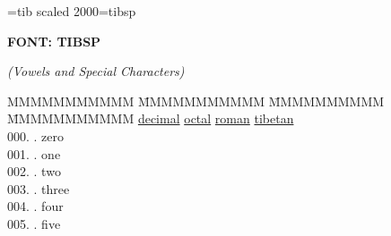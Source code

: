 \font\tibetan=tib scaled 2000\font\tibsp=tibsp 

\begin{flushleft}
{\large\bf FONT: TIBSP}

{\it (Vowels and Special Characters)}
\end{flushleft}
\vspace{.1in}

\begin{tabbing}
MMMMMMMMMMM \=MMMMMMMMMMM \=MMMMMMMMMM \= MMMMMMMMMMM \kill
\underline{decimal}\> \underline{octal}\> \underline{roman}\> \underline{tibetan} \\
000. .	\> zero	\> \bgroup\tibetan \def\u#1{\vtop{\baselineskip0pt\hbox{#1}\hbox{\tibsp\char123}}}\parindent=0pt \newbox\fillerbox\setbox\fillerbox\hbox{\vrule height0.4cm depth0.4cm width0pt}\def\filler{\copy\fillerbox}\tibsp{}\tibetan%
\filler\tenrm\ \tibetan
\egroup  \\
001. .	\> one	\> \bgroup\tibetan \def\u#1{\vtop{\baselineskip0pt\hbox{#1}\hbox{\tibsp\char123}}}\parindent=0pt \newbox\fillerbox\setbox\fillerbox\hbox{\vrule height0.4cm depth0.4cm width0pt}\def\filler{\copy\fillerbox}\tibsp{}\tibetan%
\filler\tenrm\ \tibetan
\egroup  \\
002. .	\> two	\> \bgroup\tibetan \def\u#1{\vtop{\baselineskip0pt\hbox{#1}\hbox{\tibsp\char123}}}\parindent=0pt \newbox\fillerbox\setbox\fillerbox\hbox{\vrule height0.4cm depth0.4cm width0pt}\def\filler{\copy\fillerbox}\tibsp{}\tibetan%
\filler\tenrm\ \tibetan
\egroup  \\
003. .	\> three	\> \bgroup\tibetan \def\u#1{\vtop{\baselineskip0pt\hbox{#1}\hbox{\tibsp\char123}}}\parindent=0pt \newbox\fillerbox\setbox\fillerbox\hbox{\vrule height0.4cm depth0.4cm width0pt}\def\filler{\copy\fillerbox}\tibsp{}\tibetan%
\filler\tenrm\ \tibetan
\egroup  \\
004. .	\> four	\> \bgroup\tibetan \def\u#1{\vtop{\baselineskip0pt\hbox{#1}\hbox{\tibsp\char123}}}\parindent=0pt \newbox\fillerbox\setbox\fillerbox\hbox{\vrule height0.4cm depth0.4cm width0pt}\def\filler{\copy\fillerbox}\tibsp{}\tibetan%
\filler\tenrm\ \tibetan
\egroup  \\
005. .	\> five	\> \bgroup\tibetan \def\u#1{\vtop{\baselineskip0pt\hbox{#1}\hbox{\tibsp\char123}}}\parindent=0pt \newbox\fillerbox\setbox\fillerbox\hbox{\vrule height0.4cm depth0.4cm width0pt}\def\filler{\copy\fillerbox}\tibsp{}\tibetan%

\end{tabbing}
